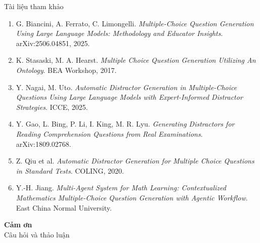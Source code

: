 \documentclass[aspectratio=169,11pt]{beamer}
\begin{document}
\begin{frame}[allowframebreaks]{Tài liệu tham khảo}
\begin{enumerate}
    \item G. Biancini, A. Ferrato, C. Limongelli. \emph{Multiple-Choice Question Generation Using Large Language Models: Methodology and Educator Insights}. arXiv:2506.04851, 2025.
    \item K. Stasaski, M. A. Hearst. \emph{Multiple Choice Question Generation Utilizing An Ontology}. BEA Workshop, 2017.
    \item Y. Nagai, M. Uto. \emph{Automatic Distractor Generation in Multiple-Choice Questions Using Large Language Models with Expert-Informed Distractor Strategies}. ICCE, 2025.
    \item Y. Gao, L. Bing, P. Li, I. King, M. R. Lyu. \emph{Generating Distractors for Reading Comprehension Questions from Real Examinations}. arXiv:1809.02768.
    \item Z. Qiu et al. \emph{Automatic Distractor Generation for Multiple Choice Questions in Standard Tests}. COLING, 2020.
    \item Y.-H. Jiang. \emph{Multi-Agent System for Math Learning: Contextualized Mathematics Multiple-Choice Question Generation with Agentic Workflow}. East China Normal University.
  \end{enumerate}
\end{frame}

\begin{frame}[plain]
  \vfill
  \centering
  {\Huge\bfseries\color{cPrimary} Cảm ơn}\\[1em]
  {\large\color{cMuted} Câu hỏi và thảo luận}
  \vfill
\end{frame}
\end{document}
